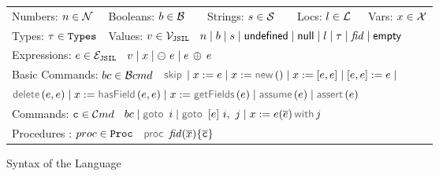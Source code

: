 \begin{figure*}[!t]
\begin{minipage}{\textwidth}
\centering
\begin{tabular}{lllll}
	 Numbers: $n \in \mathcal{N}$ &  Booleans: $b \in \mathcal{B}$ & \  \ Strings: $s \in {\mathcal S}$ & \  \ Locs: $l \in {\mathcal L}$ & \  Vars: $x \in \mathcal{X}$ \\[0.1cm]
	Types: $\tau \in \mathtt{Types}$ & \multicolumn{4}{l}{Values: $v \in \mathcal{V}_{\mathtt{JSIL}}$  \ $n \mid b \mid s \mid  {{\sf undefined}} \mid {\sf null} \mid l \mid \tau \mid \mathit{fid} \mid {\sf empty}$} \\[0.1cm]
\multicolumn{5}{l}{Expressions: $e \in \mathcal{E}_{\mathtt{JSIL}}$  \ $v \mid x \mid \ominus\ e \mid e \, \oplus_{} \, e $} \\[0.1cm]
	\multicolumn{5}{l}{Basic Commands: $bc \in \mathcal{B}cmd$ \ $\jsilskip \mid \jvar := \jsilexpr  \mid \jvar := \jsilnew() \mid \jvar := [\jsilexpr, \jsilexpr] \mid [\jsilexpr, \jsilexpr] := \jsilexpr \mid$} \\[0.1cm]
	\multicolumn{5}{l}{\hspace{2.8cm} $\jsildelete(\jsilexpr, \jsilexpr) \mid \jvar := \hasfield(\jsilexpr, \jsilexpr) \mid \jvar := \getfields(\jsilexpr) \mid \assume(\jsilexpr) \mid \assert(\jsilexpr)$} \\[0.1cm]
	\multicolumn{5}{l}{Commands: $\mathtt{c} \in \mathcal{C}md$  \ $ \bcmd \mid \goto \ i \mid  \ifgoto{\jsilexpr}{i}{j} \mid \jsilcall{\jvar}{\jsilexpr}{\jvec{\jsilexpr}}{j}$} \\[0.1cm]
	\multicolumn{5}{l}{Procedures : $proc \in \mathtt{Proc}$  \ $\procedure{\fid}{\jvec{\jvar}}{\jvec{\ivlcmd}}$}
 \end{tabular}
 \vspace*{-0.1cm}
 \caption{Syntax of the \jsil Language}
 \label{def:jsil-types}
 \vspace*{-0.5cm}
 \end{minipage}
 \end{figure*}
 


